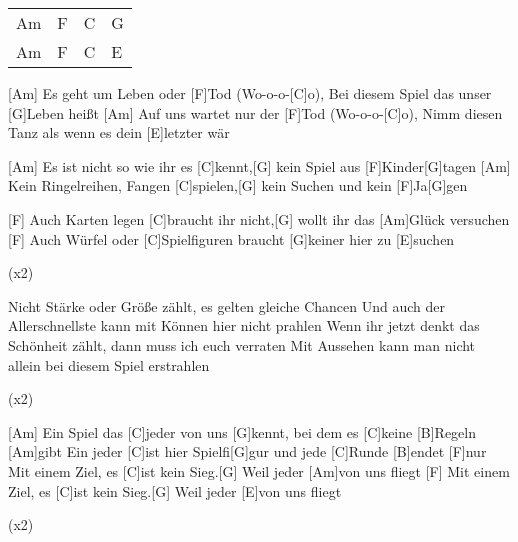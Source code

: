 

\begin{guitar}
	{\footnotesize\begin{tabular}{l|l|l|l}
			Am & F & C & G \\
			Am & F & C & E
	\end{tabular}}
	
	[Am] Es geht um Leben oder [F]Tod (Wo-o-o-[C]o),
	Bei diesem Spiel das unser [G]Leben heißt
	[Am] Auf uns wartet nur der [F]Tod (Wo-o-o-[C]o),
	Nimm diesen Tanz als wenn es dein [E]letzter wär
	
	[Am] Es ist nicht so wie ihr es [C]kennt,[G] kein Spiel aus [F]Kinder[G]tagen
	[Am] Kein Ringelreihen, Fangen [C]spielen,[G] kein Suchen und kein [F]Ja[G]gen
	
	[F] Auch Karten legen [C]braucht ihr nicht,[G] wollt ihr das [Am]Glück versuchen
	[F] Auch Würfel oder [C]Spielfiguren braucht [G]keiner hier zu [E]suchen
	
	  (x2)
	
	Nicht Stärke oder Größe zählt, es gelten gleiche Chancen
	Und auch der Allerschnellste kann mit Können hier nicht prahlen
	Wenn ihr jetzt denkt das Schönheit zählt, dann muss ich euch verraten
	Mit Aussehen kann man nicht allein bei diesem Spiel erstrahlen
	
	  (x2)
	
	[Am] Ein Spiel das [C]jeder von uns [G]kennt, bei dem es [C]keine [B]Regeln [Am]gibt
	Ein jeder [C]ist hier Spielfi[G]gur und jede [C]Runde [B]endet [F]nur
	Mit einem Ziel, es [C]ist kein Sieg.[G] Weil jeder [Am]von uns fliegt
	[F] Mit einem Ziel, es [C]ist kein Sieg.[G] Weil jeder [E]von uns fliegt
	
	  (x2)
	
\end{guitar}